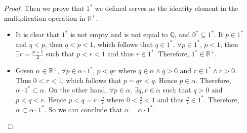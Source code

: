 \documentclass{article}
\begin{document}
\begin{proof}
  Then we prove that $1^*$ we defined serves as the identity element in the 
  multiplication operation in $\mathbb{R^+}$.
  \begin{itemize}
    \item It is clear that $1^*$ is not empty and is not equal to $\mathbb{Q}$, 
    and $0^* \subsetneq 1^*$. If $p \in 1^*$ and $q < p$, then $q < p < 1$, 
    which follows that $q \in 1^*$. $\forall p \in 1^*$, $p < 1$, then 
    $\exists r = \frac{p+1}{2}$ such that $p < r < 1$ and thus $r \in 1^*$. 
    Therefore, $1^* \in \mathbb{R^+}$.
    \item Given $\alpha \in \mathbb{R^+}$, $\forall p \in \alpha \cdot 1^*$, 
    $p < qr$ where $q \in \alpha \wedge q > 0$ and $r \in 1^* \wedge r > 0$. 
    Thus $0 < r < 1$, which follows that $p = qr < q$. Hence $p \in \alpha$. 
    Therefore, $\alpha \cdot 1^* \subset \alpha$. On the other hand, 
    $\forall p \in \alpha$, $\exists q, r \in \alpha$ such that $q > 0$ and 
    $p < q < r$. Hence $p < q = r \cdot \frac{q}{r}$ where $0 < \frac{q}{r} < 1$ 
    and thus $\frac{q}{r} \in 1^*$. Therefore, $\alpha \subset \alpha \cdot 1^*$. 
    So we can conclude that $\alpha = \alpha \cdot 1^*$.
  \end{itemize}


\end{proof}
\end{document}
